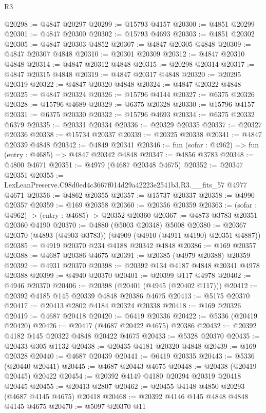 \begin{lexlean}{R3}
\begin{coremodule}
@20298 := @4847 @20297
@20299 := @15793 @4157
@20300 := @4851 @20299
@20301 := @4847 @20300
@20302 := @15793 @4693
@20303 := @4851 @20302
@20305 := @4847 @20303 @4852
@20307 := @4847 @20305 @4848
@20309 := @4847 @20307 @4848
@20310 := @20301 @20309
@20312 := @4847 @20310 @4848
@20314 := @4847 @20312 @4848
@20315 := @20298 @20314
@20317 := @4847 @20315 @4848
@20319 := @4847 @20317 @4848
@20320 := @20295 @20319
@20322 := @4847 @20320 @4848
@20324 := @4847 @20322 @4848
@20325 := @4847 @20324
@20326 := @15796 @4144
@20327 := @6375 @20326
@20328 := @15796 @4689
@20329 := @6375 @20328
@20330 := @15796 @4157
@20331 := @6375 @20330
@20332 := @15796 @4693
@20334 := @6375 @20332 @6379
@20335 := @20331 @20334
@20336 := @20329 @20335
@20337 := @20327 @20336
@20338 := @15734 @20337
@20339 := @20325 @20338
@20341 := @4847 @20339 @4848
@20342 := @4849 @20341
@20346 := fun (sofar : @4962) => fun (entry : @4685) => @4847 @20342 @4848
@20347 := @4856 @3783
@20348 := @4800 @4671
@20351 := @4979 (@4687 @20348 @4675)
@20352 := @20347 @20351
@20355 := LexLeanPreserve.C98d0ed4c3667f014d29a42223e2541b3.R3.__fits_57 @4977 @4671
@20356 := @4862 @20355
@20357 := @15737 @20337
@20358 := @4990 @20357
@20359 := @169 @20358
@20360 := @20356 @20359
@20363 := (sofar : @4962) -> (entry : @4685) -> @20352 @20360
@20367 := @4873 @3783 @20351 @20360 @4190
@20370 := @4880 (@5003 @20348) @5008
@20380 := @20367 @20370 (@4893 (@4903 @3783)) (@4909 (@4910 (@4911 @4190) @20351 @4887))
@20385 := @4919 @20370 @234 @4188 @20342 @4848
@20386 := @169 @20357
@20388 := @4687 @20386 @4675
@20391 := @20385 (@4979 @20388) @20359
@20392 := @4931 @20370
@20398 := @20392 @134 @4187 @4848 @20341 @4978 @20388
@20399 := @4940 @20370
@20401 := @20399 @117 @4978
@20402 := @4946 @20370
@20406 := @20398 (@20401 (@4945 (@20402 @117)))
@20412 := @20392 @4185 @145 @20339 @4848 @20386 @4675
@20413 := @5175 @20370
@20417 := @20413 @2802 @4184 @20324 @20338
@20418 := @169 @20326
@20419 := @4687 @20418
@20420 := @6419 @20336
@20422 := @5336 (@20419 @20420)
@20426 := @20417 (@4687 @20422 @4675) @20386
@20432 := @20392 @4182 @145 @20322 @4848 @20422 @4675
@20433 := @5328 @20370
@20435 := @20433 @305 @1132
@20438 := @20435 @4181 @20320 @4848
@20439 := @169 @20328
@20440 := @4687 @20439
@20441 := @6419 @20335
@20443 := @5336 (@20440 @20441)
@20445 := @4687 @20443 @4675
@20448 := @20438 (@20419 @20445) @20422
@20454 := @20392 @4149 @4180 @20294 @20319 @20418 @20445
@20455 := @20413 @2807
@20462 := @20455 @4148 @4850 @20293 (@4687 @4145 @4675) @20418
@20468 := @20392 @4146 @145 @4848 @4848 @4145 @4675
@20470 := @5097 @20370 @11

\end{coremodule}
\end{lexlean}

